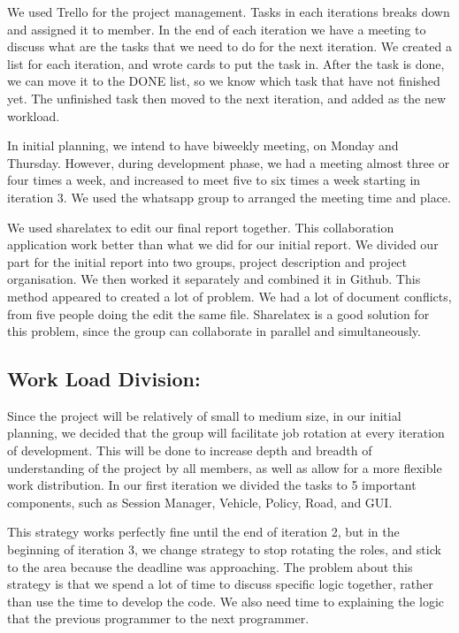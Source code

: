\documentclass[11pt]{article}
\begin{document}
We used Trello for the project management. Tasks in each iterations breaks down and assigned it to member. In the end of each iteration we have a meeting to discuss what are the tasks that we need to do for the next iteration. We created a list for each iteration, and wrote cards to put the task in. After the task is done, we can move it to the DONE list, so we know which task that have not finished yet. The unfinished task then moved to the next iteration, and added as the new workload.

In initial planning, we intend to have biweekly meeting, on Monday and Thursday. However, during development phase, we had a meeting almost three or four times a week, and increased to meet five to six times a week starting in iteration 3. We used the whatsapp group to arranged the meeting time and place. 

We used sharelatex to edit our final report together. This collaboration application work better than what we did for our initial report. We divided our part for the initial report into two groups, project description and project organisation. We then worked it separately and combined it in Github. This method appeared to created a lot of problem. We had a lot of document conflicts, from five people doing the edit the same file. Sharelatex is a good solution for this problem, since the group can collaborate in parallel and simultaneously. 

\subsection{Work Load Division:}
Since the project will be relatively of small to medium size, in our initial planning, we decided that the group will facilitate job rotation at every iteration of development. This will be done to increase depth and breadth of understanding of the project by all members, as well as allow for a more flexible work distribution. In our first iteration we divided the tasks to 5 important components, such as Session Manager, Vehicle, Policy, Road, and GUI.

This strategy works perfectly fine until the end of iteration 2, but in the beginning of iteration 3, we change strategy to stop rotating the roles, and stick to the area because the deadline was approaching. The problem about this strategy is that we spend a lot of time to discuss specific logic together, rather than use the time to develop the code. We also need time to explaining the logic that the previous programmer to the next programmer. 
\end{document}
